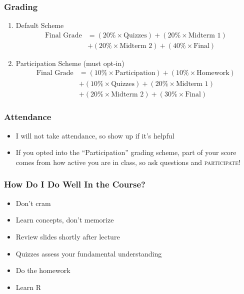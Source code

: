 \documentclass[handout]{beamer}
\begin{document}
\begin{frame}
\frametitle{Grading}
	\begin{enumerate}
		\item \alert{Default Scheme}
			\begin{align*}
			\text{Final Grade} &= (20\% \times \text{Quizzes}) + (20\% \times \text{Midterm 1})  
			\\
			&+ (20\% \times \text{Midterm 2}) + (40\% \times \text{Final})
			\end{align*}
		\item \alert{Participation Scheme (must opt-in)}
			\begin{align*}
			\text{Final Grade} &= (10\% \times \text{Participation}) + (10\% \times \text{Homework})
			\\
			&+ (10\% \times \text{Quizzes}) + (20\% \times \text{Midterm 1}) 
			\\
			&+ (20\% \times \text{Midterm 2}) + (30\% \times \text{Final})
			\end{align*}
	\end{enumerate}
\end{frame}

\begin{frame}
\frametitle{Attendance}
	\begin{itemize}
		\item I will not take attendance, so show up if it's helpful
		\item If you opted into the ``Participation'' grading scheme, part of your score comes from 			how active you are in class, so ask questions and \alert{\textsc{participate}}!
	\end{itemize}
\end{frame}

\begin{frame}
\frametitle{How Do I Do Well In the Course?}
	\begin{itemize}[<+- | alert@+>]
		\item Don't cram
		\item Learn concepts, don't memorize
		\item Review slides shortly after lecture
		\item Quizzes assess your fundamental understanding
		\item Do the homework
		\item Learn R\alert<7>{\only<7>{, seriously.}}
	\end{itemize}
\end{frame}
\end{document}
